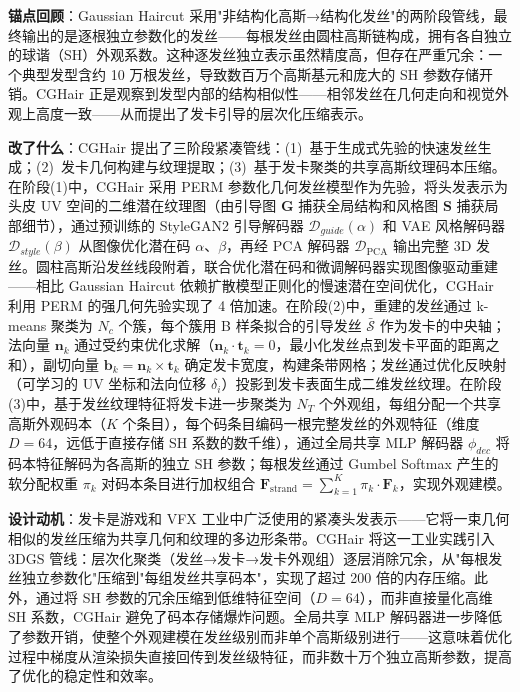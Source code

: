 \textbf{锚点回顾}：Gaussian Haircut 采用"非结构化高斯→结构化发丝"的两阶段管线，最终输出的是逐根独立参数化的发丝——每根发丝由圆柱高斯链构成，拥有各自独立的球谐（SH）外观系数。这种逐发丝独立表示虽然精度高，但存在严重冗余：一个典型发型含约 10 万根发丝，导致数百万个高斯基元和庞大的 SH 参数存储开销。CGHair 正是观察到发型内部的结构相似性——相邻发丝在几何走向和视觉外观上高度一致——从而提出了发卡引导的层次化压缩表示。

\textbf{改了什么}：CGHair 提出了三阶段紧凑管线：(1)~基于生成式先验的快速发丝生成；(2)~发卡几何构建与纹理提取；(3)~基于发卡聚类的共享高斯纹理码本压缩。在阶段(1)中，CGHair 采用 PERM 参数化几何发丝模型作为先验，将头发表示为头皮 UV 空间的二维潜在纹理图（由引导图 $\mathbf{G}$ 捕获全局结构和风格图 $\mathbf{S}$ 捕获局部细节），通过预训练的 StyleGAN2 引导解码器 $\mathcal{D}_{guide}(\alpha)$ 和 VAE 风格解码器 $\mathcal{D}_{style}(\beta)$ 从图像优化潜在码 $\alpha$、$\beta$，再经 PCA 解码器 $\mathcal{D}_{\mathrm{PCA}}$ 输出完整 3D 发丝。圆柱高斯沿发丝线段附着，联合优化潜在码和微调解码器实现图像驱动重建——相比 Gaussian Haircut 依赖扩散模型正则化的慢速潜在空间优化，CGHair 利用 PERM 的强几何先验实现了 4 倍加速。在阶段(2)中，重建的发丝通过 k-means 聚类为 $N_c$ 个簇，每个簇用 B 样条拟合的引导发丝 $\bar{\mathcal{S}}$ 作为发卡的中央轴；法向量 $\mathbf{n}_k$ 通过受约束优化求解（$\mathbf{n}_k \cdot \mathbf{t}_k = 0$，最小化发丝点到发卡平面的距离之和），副切向量 $\mathbf{b}_k = \mathbf{n}_k \times \mathbf{t}_k$ 确定发卡宽度，构建条带网格；发丝通过优化反映射（可学习的 UV 坐标和法向位移 $\delta_i$）投影到发卡表面生成二维发丝纹理。在阶段(3)中，基于发丝纹理特征将发卡进一步聚类为 $N_T$ 个外观组，每组分配一个共享高斯外观码本（$K$ 个条目），每个码条目编码一根完整发丝的外观特征（维度 $D=64$，远低于直接存储 SH 系数的数千维），通过全局共享 MLP 解码器 $\phi_{dec}$ 将码本特征解码为各高斯的独立 SH 参数；每根发丝通过 Gumbel Softmax 产生的软分配权重 $\pi_k$ 对码本条目进行加权组合 $\mathbf{F}_{\text{strand}} = \sum_{k=1}^{K} \pi_k \cdot \mathbf{F}_k$，实现外观建模。

\textbf{设计动机}：发卡是游戏和 VFX 工业中广泛使用的紧凑头发表示——它将一束几何相似的发丝压缩为共享几何和纹理的多边形条带。CGHair 将这一工业实践引入 3DGS 管线：层次化聚类（发丝→发卡→发卡外观组）逐层消除冗余，从"每根发丝独立参数化"压缩到"每组发丝共享码本"，实现了超过 200 倍的内存压缩。此外，通过将 SH 参数的冗余压缩到低维特征空间（$D=64$），而非直接量化高维 SH 系数，CGHair 避免了码本存储爆炸问题。全局共享 MLP 解码器进一步降低了参数开销，使整个外观建模在发丝级别而非单个高斯级别进行——这意味着优化过程中梯度从渲染损失直接回传到发丝级特征，而非数十万个独立高斯参数，提高了优化的稳定性和效率。

